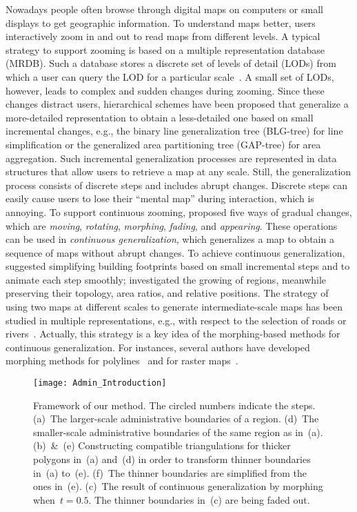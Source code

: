 Nowadays people often browse through digital maps 
on computers or small displays to get geographic information. 
To understand maps better, 
users interactively zoom in and out to read maps 
from different levels. 
A typical strategy to support zooming is based on a
multiple representation database (MRDB).  
Such a database stores a discrete set of levels of detail (LODs) 
from which a user can query the LOD for a particular 
scale~\parencite{Hampe2004multiple}. 
A small set of LODs, however, leads to 
complex and sudden changes during zooming. 
%
Since these changes distract users, 
hierarchical schemes have been proposed
that generalize a more-detailed representation to obtain a
less-detailed one based on small incremental changes, 
e.g., the binary line generalization tree (BLG-tree)
\parencite{vanOosterom2005} 
for line simplification or
the generalized area partitioning tree (GAP-tree)
\parencite{vanOosterom1995GAPTree}
for area aggregation.  
Such incremental generalization processes are represented 
in data structures 
that allow users to retrieve a map at any scale.  
Still, the generalization process consists of discrete steps 
and includes abrupt changes.  
Discrete steps can easily cause users to lose their
``mental map'' during interaction, which is annoying. 
To support continuous zooming, 
\textcite{vanKreveld2001} proposed five ways of gradual changes, 
which are \emph{moving}, \emph{rotating}, \emph{morphing}, 
\emph{fading}, and \emph{appearing}. 
These operations can be used 
in \emph{continuous generalization},
which generalizes a map to obtain a sequence of maps 
without abrupt changes.
To achieve continuous generalization, 
\textcite{Sester2004} suggested simplifying building
footprints based on small incremental steps and 
to animate each step smoothly;
\textcite{Danciger2009} investigated the growing of regions, 
meanwhile preserving their topology, area ratios, and
relative positions. 
The strategy of using two maps at different scales
to generate intermediate-scale maps has been studied in multiple
representations, e.g., with respect to the selection of roads or
rivers~\parencite{Girres2014}. 
Actually, this strategy is a key idea of the
morphing-based methods for continuous generalization. 
For instances, several authors have developed  
morphing methods for polylines~\parencite{Cecconi2003, 
Noellenburg2008, Peng2013LSA, Schneider2015,
Peng2012River,Deng2015}
and for raster 
maps~\parencite{Reilly2004,
	Pantazis2009b}.  %


\begin{figure}[tb]	
	\centering
	\texttt{[image: Admin\_Introduction]}
	\caption{Framework of our method.
		The circled numbers indicate the steps. 
		(a)~The larger-scale administrative boundaries of a 
		region. 
		(d)~The smaller-scale administrative boundaries of the 
		same region as in~(a). 
		(b)~\&~(e) Constructing compatible triangulations for
		thicker polygons in~(a) and~(d) in order to 
		transform thinner boundaries in~(a) to~(e).
		(f)~The thinner boundaries are simplified from the 
		ones in~(e). 
		(c)~The result of continuous generalization
		by morphing when~$t=0.5$.
		The thinner boundaries in~(c) are being faded out.
		}
	\label{fig:Admin_Introduction}
\end{figure}

